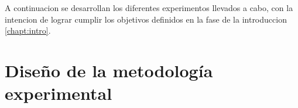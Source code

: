 A continuacion se desarrollan los diferentes experimentos llevados a cabo, con la intencion de lograr cumplir los objetivos definidos en la fase de la introduccion \ref{chapt:intro}.

\section{Diseño de la metodología experimental}
